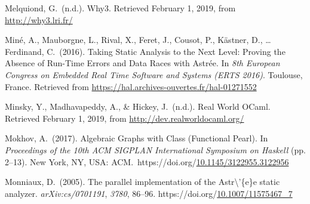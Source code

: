 \documentclass[12pt,twoside]{article}
\begin{document}
{\begin{thebibliography}{222}
\mdbibitemlabel{[Melquiond, n.d.]}Melquiond, G.~(n.d.). Why3. Retrieved February 1, 2019, from \href{http://why3.lri.fr/}{{\ttfamily http://\hspace{0pt}why3.\hspace{0pt}lri.\hspace{0pt}fr/\hspace{0pt}}}\label{melquiond_why3_nodate}%

\mdbibitemlabel{[Miné et al., 2016]}Miné, A., Mauborgne, L., Rival, X., Feret, J., Cousot, P., Kästner, D., … Ferdinand, C.~(2016). Taking Static Analysis to the Next Level: Proving the Absence of Run-Time Errors and Data Races with Astrée. In \emph{8th European Congress on Embedded Real Time Software and Systems (ERTS 2016)}. Toulouse, France. Retrieved from \href{https://hal.archives-ouvertes.fr/hal-01271552}{{\ttfamily https://\hspace{0pt}hal.\hspace{0pt}archives-\hspace{0pt}ouvertes.\hspace{0pt}fr/\hspace{0pt}hal-\hspace{0pt}01271552}}\label{mine_taking_2016}%

Minsky, Y., Madhavapeddy, A., \& Hickey, J.~(n.d.). Real World OCaml. Retrieved February 1, 2019, from \href{http://dev.realworldocaml.org/}{{\ttfamily http://\hspace{0pt}dev.\hspace{0pt}realworldocaml.\hspace{0pt}org/\hspace{0pt}}}\label{minsky_real_nodate}%

\mdbibitemlabel{[Mokhov, 2017]}Mokhov, A.~(2017). Algebraic Graphs with Class (Functional Pearl). In \emph{Proceedings of the 10th ACM SIGPLAN International Symposium on Haskell} (pp. 2–13). New York, NY, USA: ACM.~https://doi.org/\href{https://dx.doi.org/10.1145/3122955.3122956}{10.1145/3122955.3122956}\label{mokhov_algebraic_2017}%

\mdbibitemlabel{[Monniaux, 2005]}Monniaux, D.~(2005). The parallel implementation of the Astr\textbackslash{}’\{e\}e static analyzer. \emph{arXiv:cs/0701191}, \emph{3780}, 86–96. https://doi.org/\href{https://dx.doi.org/10.1007/11575467_7}{10.1007/11575467\_7}\label{monniaux_parallel_2005}%


\end{thebibliography}}
\end{document}
